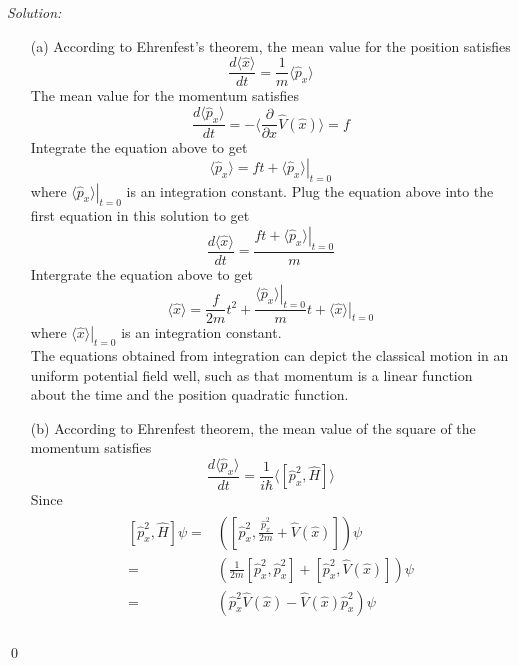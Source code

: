 \documentclass[12pt,a4paper]{article}
\newenvironment{sol}
    {\emph{Solution:}
    }
    {
    \qed
    }
\begin{document}
\begin{sol}
\begin{itemize}
\item[(a)] According to Ehrenfest's theorem, the mean value for the position satisfies
\begin{equation}
\frac{d\langle\hat{x}\rangle}{dt}=\frac{1}{m}\langle\hat{p}_x\rangle
\end{equation}
The mean value for the momentum satisfies
\begin{equation}
\frac{d\langle\hat{p}_x\rangle}{dt}=-\langle\frac{\partial}{\partial x}\hat{V}(\hat{x})\rangle=f
\end{equation}
Integrate the equation above to get
\begin{equation}
\langle\hat{p}_x\rangle=ft+\left.\langle\hat{p}_x\rangle\right|_{t=0}
\end{equation}
where $\left.\langle\hat{p}_x\rangle\right|_{t=0}$ is an integration constant. Plug the equation above into the first equation in this solution to get
\begin{equation}
\frac{d\langle\hat{x}\rangle}{dt}=\frac{ft+\left.\langle\hat{p}_x\rangle\right|_{t=0}}{m}
\end{equation}
Intergrate the equation above to get
\begin{equation}
\langle\hat{x}\rangle=\frac{f}{2m}t^2+\frac{\left.\langle\hat{p}_x\rangle\right|_{t=0}}{m}t+\left.\langle\hat{x}\rangle\right|_{t=0}
\end{equation}
where $\left.\langle\hat{x}\rangle\right|_{t=0}$ is an integration constant.\\
The equations obtained from integration can depict the classical motion in an uniform potential field well, such as that momentum is a linear function about the time and the position quadratic function.
\item[(b)] According to Ehrenfest theorem, the mean value of the square of the momentum satisfies
\begin{equation}
\frac{d\langle\hat{p}_x\rangle}{dt}=\frac{1}{i\hbar}\langle[\hat{p}_x^2,\hat{H}]\rangle
\end{equation}
Since
\begin{gather}
\begin{align}
\nonumber[\hat{p}_x^2,\hat{H}]\psi=&\left([\hat{p}_x^2,\frac{\hat{p}_x^2}{2m}+\hat{V}(\hat{x})]\right)\psi\\
\nonumber=&\left(\frac{1}{2m}[\hat{p}_x^2,\hat{p}_x^2]+[\hat{p}_x^2,\hat{V}(\hat{x})]\right)\psi\\
\nonumber=&\left(\hat{p}_x^2\hat{V}(\hat{x})-\hat{V}(\hat{x})\hat{p}_x^2\right)\psi\\

\end{align}
\end{gather}
\end{itemize}
\end{sol}
\end{document}
